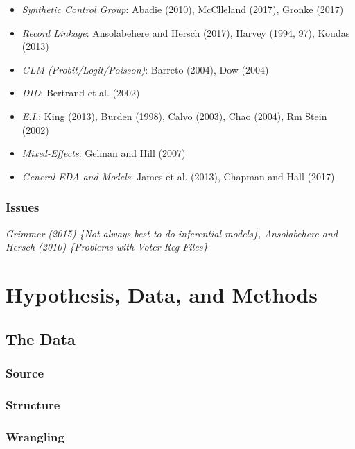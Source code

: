 \documentclass[12pt,twoside]{reedthesis}
\providecommand{\tightlist}{%
  \setlength{\itemsep}{0pt}\setlength{\parskip}{0pt}}
\begin{document}
  \begin{itemize}
  \tightlist
  \item
    \emph{Synthetic Control Group}: Abadie (2010), McClleland (2017),
    Gronke (2017)
  \item
    \emph{Record Linkage}: Ansolabehere and Hersch (2017), Harvey (1994,
    97), Koudas (2013)
  \item
    \emph{GLM (Probit/Logit/Poisson)}: Barreto (2004), Dow (2004)
  \item
    \emph{DID}: Bertrand et al. (2002)
  \item
    \emph{E.I.}: King (2013), Burden (1998), Calvo (2003), Chao (2004), Rm
    Stein (2002)
  \item
    \emph{Mixed-Effects}: Gelman and Hill (2007)
  \item
    \emph{General EDA and Models}: James et al. (2013), Chapman and Hall
    (2017)
  \end{itemize}
  
  \subsection{Issues}\label{issues}
  
  \emph{Grimmer (2015) \{Not always best to do inferential models\},
  Ansolabehere and Hersch (2010) \{Problems with Voter Reg Files\}}
  
  \chapter{Hypothesis, Data, and
  Methods}\label{hypothesis-data-and-methods}
  
  \section{The Data}\label{the-data}
  
  \subsection{Source}\label{source}
  
  \subsection{Structure}\label{structure}
  
  \subsection{Wrangling}\label{wrangling}
  
\end{document}
